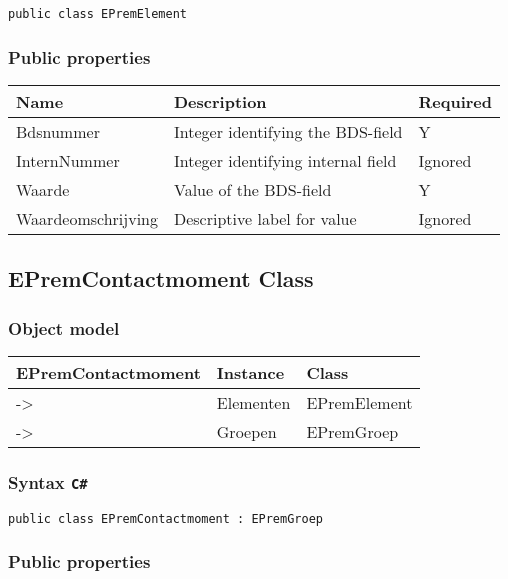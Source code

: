 \documentclass[
]{book}
\begin{document}
\texttt{public\ class\ EPremElement}

\hypertarget{public-properties-2}{%
\subsubsection{Public properties}\label{public-properties-2}}

\begin{longtable}[]{@{}lll@{}}
\toprule
Name & Description & Required \\
\midrule
\endhead
Bdsnummer & Integer identifying the BDS-field & Y \\
InternNummer & Integer identifying internal field & Ignored \\
Waarde & Value of the BDS-field & Y \\
Waardeomschrijving & Descriptive label for value & Ignored \\
\bottomrule
\end{longtable}

\hypertarget{epremcontactmoment-class}{%
\subsection{EPremContactmoment Class}\label{epremcontactmoment-class}}

\hypertarget{object-model-2}{%
\subsubsection{Object model}\label{object-model-2}}

\begin{longtable}[]{@{}lll@{}}
\toprule
EPremContactmoment & Instance & Class \\
\midrule
\endhead
-\textgreater{} & Elementen & EPremElement \\
-\textgreater{} & Groepen & EPremGroep \\
\bottomrule
\end{longtable}

\hypertarget{syntax-c-3}{%
\subsubsection{\texorpdfstring{Syntax \texttt{C\#}}{Syntax C\#}}\label{syntax-c-3}}

\texttt{public\ class\ EPremContactmoment\ :\ EPremGroep}

\hypertarget{public-properties-3}{%
\subsubsection{Public properties}\label{public-properties-3}}
\end{document}

